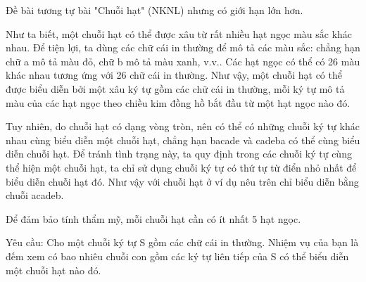 Đề bài tương tự bài "Chuỗi hạt" (NKNL) nhưng có giới hạn lớn hơn.  

   Như ta biết, một chuỗi hạt có thể được xâu từ rất nhiều hạt ngọc màu sắc khác nhau. Để tiện lợi, ta dùng các chữ cái in thường để mô tả các màu sắc: chẳng hạn chữ a mô tả màu đỏ, chữ b mô tả màu xanh, v.v.. Các hạt ngọc có thể có 26 màu khác nhau tương ứng với 26 chữ cái in thường. Như vậy, một chuỗi hạt có thể được biểu diễn bởi một xâu ký tự gồm các chữ cái in thường, mỗi ký tự mô tả màu của các hạt ngọc theo chiều kim đồng hồ bắt đầu từ một hạt ngọc nào đó.  

   Tuy nhiên, do chuỗi hạt có dạng vòng tròn, nên có thể có những chuỗi ký tự khác nhau cùng biểu diễn một chuỗi hạt, chẳng hạn bacade và cadeba có thể cùng biểu diễn chuỗi hạt. Để tránh tình trạng này, ta quy định trong các chuỗi ký tự cùng thể hiện một chuỗi hạt, ta chỉ sử dụng chuỗi ký tự có thứ tự từ điển nhỏ nhất để biểu diễn chuỗi hạt đó. Như vậy với chuỗi hạt ở ví dụ nêu trên chỉ biểu diễn bằng chuỗi acadeb.  

   Để đảm bảo tính thẩm mỹ, mỗi chuỗi hạt cần có ít nhất 5 hạt ngọc.  

   Yêu cầu: Cho một chuỗi ký tự S gồm các chữ cái in thường. Nhiệm vụ của bạn là đếm xem có bao nhiêu chuỗi con gồm các ký tự liên tiếp của S có thể biểu diễn một chuỗi hạt nào đó.  

\